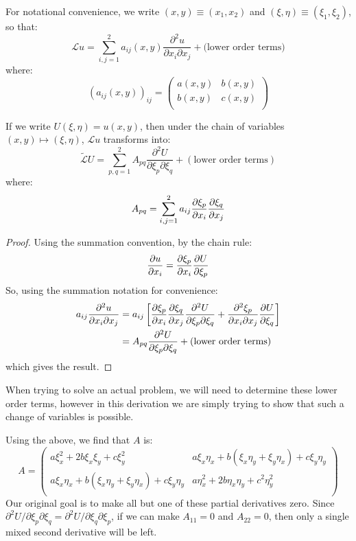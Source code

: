 \documentclass[../main.tex]{subfiles}
\begin{document}
For notational convenience, we write $(x, y) \equiv (x_1, x_2)$ and $(\xi, \eta) \equiv (\xi_1, \xi_2)$, so that:
\[
  \mathcal{L}u = \sum_{i, j = 1}^{2} a_{i j}(x, y) \frac{\partial^2 u}{\partial x_i \partial x_j} + \text{(lower order terms)}
\]
where:
\[
  (a_{i j}(x, y))_{i j} = \begin{pmatrix}
  a(x, y) & b(x, y) \\
  b(x, y) & c(x, y) \\
  \end{pmatrix}
\]
\begin{proposition}
  If we write $U(\xi, \eta) = u(x, y)$, then under the chain of variables $(x, y) \mapsto (\xi, \eta)$, $\mathcal{L}u$ transforms into:
  \[
    \widetilde{\mathcal{L}}U = \sum_{p, q = 1}^{2} A_{p q} \frac{\partial^2 U}{\partial \xi_p \partial \xi_q} + (\text{lower order terms})
  \]
  where:
  \[
    A_{p q} = \sum_{i, j = 1}^{2} a_{i j} \pderiv{\xi_p}{x_i} \pderiv{\xi_q}{x_j}
  \]
\end{proposition}
\begin{proof}
  Using the summation convention, by the chain rule:
  \[
    \pderiv{u}{x_i} = \pderiv{\xi_p}{x_i} \pderiv{U}{\xi_p}
  \]
  So, using the summation notation for convenience:
  \begin{align*}
    a_{i j} \frac{\partial^2 u}{\partial x_i \partial x_j} &= a_{i j}\left[\pderiv{\xi_p}{x_i} \pderiv{\xi_q}{x_j} \frac{\partial^2 U}{\partial \xi_p \partial \xi_q} + \frac{\partial^2 \xi_p}{\partial x_i \partial x_j} \pderiv{U}{\xi_q}\right] \\
                                                           &= A_{p q} \frac{\partial^2 U}{\partial \xi_p \partial \xi_q} + \text{(lower order terms)}
  \end{align*}
  which gives the result.
\end{proof}
\begin{remark}
  When trying to solve an actual problem, we will need to determine these lower order terms, however in this derivation we are simply trying to show that such a change of variables is possible.
\end{remark}
Using the above, we find that $A$ is:
\[
  A = \begin{pmatrix}
    a \xi^2_x + 2b\xi_x\xi_y + c \xi^2_y & a \xi_x \eta_x + b(\xi_x \eta_y + \xi_y \eta_x) + c \xi_y \eta_y \\
    a \xi_x \eta_x + b(\xi_x \eta_y + \xi_y \eta_x) + c \xi_y \eta_y &  a \eta^2_x + 2b \eta_x \eta_y + c^2 \eta^2_y\\
  \end{pmatrix}
\]
Our original goal is to make all but one of these partial derivatives zero.
Since $\partial^2 U/\partial \xi_p \partial \xi_q = \partial^2 U/\partial \xi_q \partial \xi_p$, if we can make $A_{1 1} = 0$ and $A_{2 2} = 0$, then only a single mixed second derivative will be left.
\end{document}
